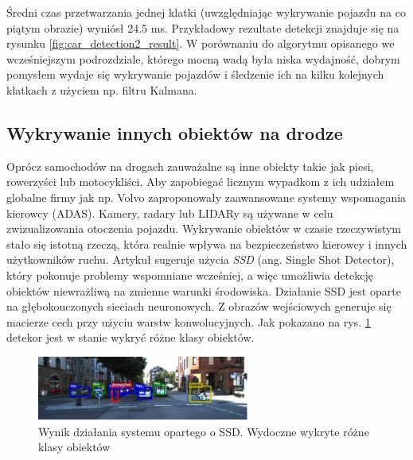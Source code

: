 Średni czas przetwarzania jednej klatki (uwzględniając wykrywanie pojazdu na co piątym obrazie) wyniósł 24.5 ms. Przykładowy rezultate detekcji znajduje się na rysunku \ref{fig:car_detection2_result}.
W porównaniu do algorytmu opisanego we wcześniejszym podrozdziale, którego mocną wadą była niska wydajność, dobrym pomysłem wydaje się wykrywanie pojazdów i śledzenie ich na kilku kolejnych klatkach z użyciem np. filtru Kalmana.




\subsection{Wykrywanie innych obiektów na drodze}
Oprócz samochodów na drogach zauważalne są inne obiekty takie jak piesi, rowerzyści lub motocykliści. Aby zapobiegać licznym wypadkom z ich udziałem globalne firmy jak np. Volvo zaproponowały zaawansowane systemy wspomagania kierowcy (ADAS).
Kamery, radary lub LIDARy są używane w celu zwizualizowania otoczenia pojazdu. Wykrywanie obiektów w czasie rzeczywistym stało się istotną rzeczą, która realnie wpływa na bezpieczeństwo kierowcy i innych użytkowników ruchu.
Artykuł \cite{T12} sugeruje użycia \textit{SSD} (ang. Single Shot Detector), który pokonuje problemy wspomniane wcześniej, a więc umożliwia detekcję obiektów niewrażliwą na zmienne warunki środowiska.
Działanie SSD jest oparte na głębokouczonych sieciach neuronowych. Z obrazów wejściowych generuje się macierze cech przy użyciu warstw konwolucyjnych. 
Jak pokazano na rys. \ref{fig:pedestrian_detect_result} detekor jest w stanie wykryć różne klasy obiektów.

\begin{figure}
  \centering
  \includegraphics[width=7cm]{img/pedestrian_detect_result.png}
  \caption{Wynik działania systemu opartego o SSD. Wydoczne wykryte różne klasy obiektów \cite{T11}}
  \label{fig:pedestrian_detect_result}
\end{figure}

